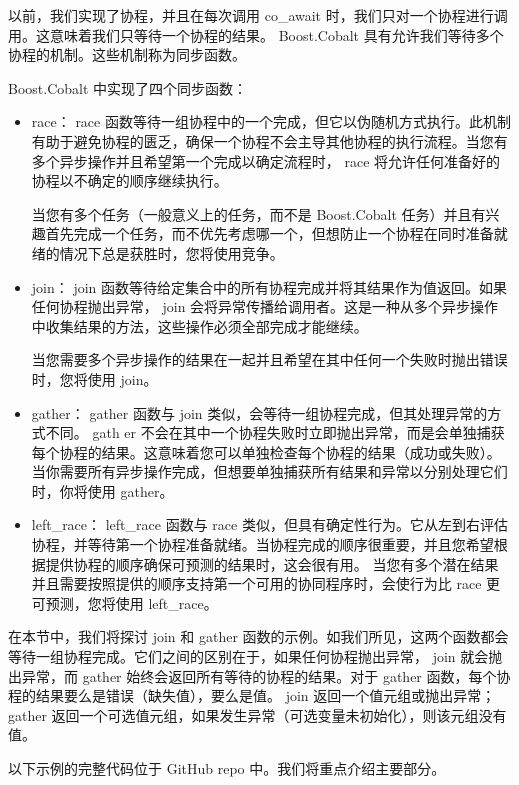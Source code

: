 以前，我们实现了协程，并且在每次调用 co\_await 时，我们只对一个协程进行调用。这意味着我们只等待一个协程的结果。 Boost.Cobalt 具有允许我们等待多个协程的机制。这些机制称为同步函数。

Boost.Cobalt 中实现了四个同步函数：

\begin{itemize}
\item
race： race 函数等待一组协程中的一个完成，但它以伪随机方式执行。此机制有助于避免协程的匮乏，确保一个协程不会主导其他协程的执行流程。当您有多个异步操作并且希望第一个完成以确定流程时， race 将允许任何准备好的协程以不确定的顺序继续执行。

当您有多个任务（一般意义上的任务，而不是 Boost.Cobalt 任务）并且有兴趣首先完成一个任务，而不优先考虑哪一个，但想防止一个协程在同时准备就绪的情况下总是获胜时，您将使用竞争。

\item
join： join 函数等待给定集合中的所有协程完成并将其结果作为值返回。如果任何协程抛出异常， join 会将异常传播给调用者。这是一种从多个异步操作中收集结果的方法，这些操作必须全部完成才能继续。

当您需要多个异步操作的结果在一起并且希望在其中任何一个失败时抛出错误时，您将使用 join。

\item
gather： gather 函数与 join 类似，会等待一组协程完成，但其处理异常的方式不同。 gath er 不会在其中一个协程失败时立即抛出异常，而是会单独捕获每个协程的结果。这意味着您可以单独检查每个协程的结果（成功或失败）。
当你需要所有异步操作完成，但想要单独捕获所有结果和异常以分别处理它们时，你将使用 gather。

\item
left\_race： left\_race 函数与 race 类似，但具有确定性行为。它从左到右评估协程，并等待第一个协程准备就绪。当协程完成的顺序很重要，并且您希望根据提供协程的顺序确保可预测的结果时，这会很有用。
当您有多个潜在结果并且需要按照提供的顺序支持第一个可用的协同程序时，会使行为比 race 更可预测，您将使用 left\_race。
\end{itemize}

在本节中，我们将探讨 join 和 gather 函数的示例。如我们所见，这两个函数都会等待一组协程完成。它们之间的区别在于，如果任何协程抛出异常， join 就会抛出异常，而 gather 始终会返回所有等待的协程的结果。对于 gather 函数，每个协程的结果要么是错误（缺失值），要么是值。 join 返回一个值元组或抛出异常； gather 返回一个可选值元组，如果发生异常（可选变量未初始化），则该元组没有值。

以下示例的完整代码位于 GitHub repo 中。我们将重点介绍主要部分。


